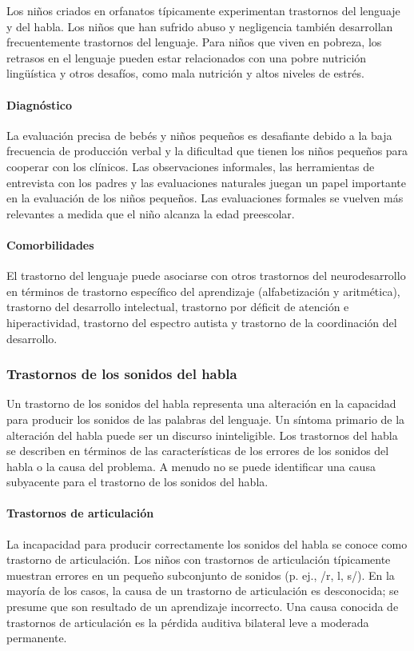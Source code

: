 \documentclass[11pt,letterpaper]{report}
\begin{document}
Los niños criados en orfanatos típicamente experimentan trastornos del
lenguaje y del habla. Los niños que han sufrido abuso y negligencia también
desarrollan frecuentemente trastornos del lenguaje. Para niños que viven en
pobreza, los retrasos en el lenguaje pueden estar relacionados con una pobre
nutrición lingüística y otros desafíos, como mala nutrición y altos niveles
de estrés. \cite{Feldman44}

\paragraph{Diagnóstico}
La evaluación precisa de bebés y niños pequeños es desafiante debido a la
baja frecuencia de producción verbal y la dificultad que tienen los niños
pequeños para cooperar con los clínicos. Las observaciones informales, las
herramientas de entrevista con los padres y las evaluaciones naturales juegan
un papel importante en la evaluación de los niños pequeños. Las evaluaciones
formales se vuelven más relevantes a medida que el niño alcanza la edad
preescolar. \cite{Nelson53}

\paragraph{Comorbilidades}
El trastorno del lenguaje puede asociarse con otros trastornos del
neurodesarrollo en términos de trastorno específico del aprendizaje
(alfabetización y aritmética), trastorno del desarrollo intelectual, trastorno
por déficit de atención e hiperactividad, trastorno del espectro autista y
trastorno de la coordinación del desarrollo. \cite{Feldman44}

\subsubsection{Trastornos de los sonidos del habla}
Un trastorno de los sonidos del habla representa una alteración en la
capacidad para producir los sonidos de las palabras del lenguaje. Un síntoma
primario de la alteración del habla puede ser un discurso ininteligible. Los
trastornos del habla se describen en términos de las características de los
errores de los sonidos del habla o la causa del problema. A menudo no se puede
identificar una causa subyacente para el trastorno de los sonidos del habla.
\cite{Feldman44}

\paragraph{Trastornos de articulación}
La incapacidad para producir correctamente los sonidos del habla se conoce
como trastorno de articulación. Los niños con trastornos de articulación
típicamente muestran errores en un pequeño subconjunto de sonidos
(p. ej., /r, l, s/). En la mayoría de los casos, la causa de un trastorno de
articulación es desconocida; se presume que son resultado de un aprendizaje
incorrecto. Una causa conocida de trastornos de articulación es la pérdida
auditiva bilateral leve a moderada permanente. \cite{Feldman44}
\end{document}
